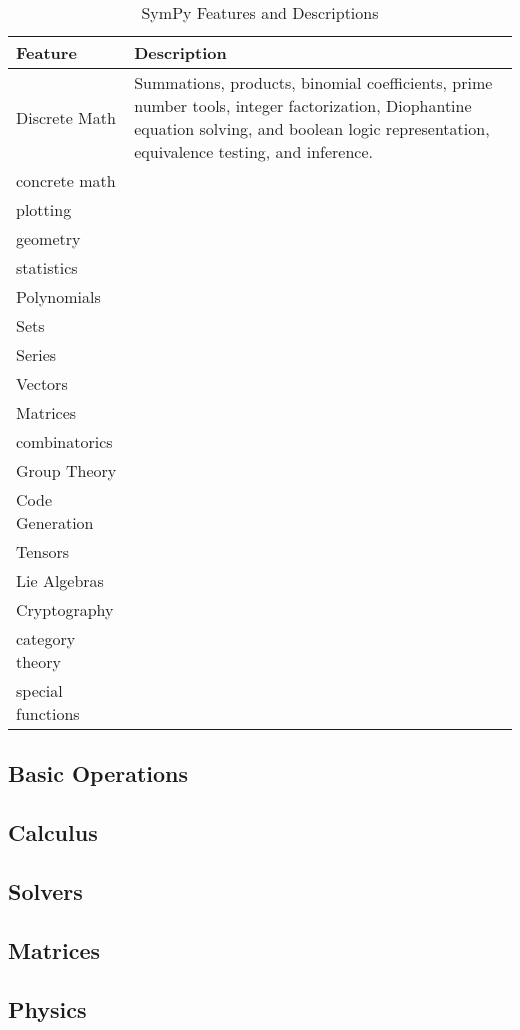 
\begin{table}
\label{features-table}
\caption{SymPy Features and Descriptions}
\begin{tabular}[htbc]{|l|l|}
\hline
\textbf{Feature} & \textbf{Description} \\
\hline
Discrete Math & Summations, products, binomial coefficients, prime number
    tools, integer factorization, Diophantine equation solving, and
    boolean logic representation, equivalence testing, and inference.\\
concrete math & \\
plotting & \\
geometry & \\
statistics & \\
Polynomials & \\
Sets & \\
Series & \\
Vectors & \\
Matrices & \\
combinatorics & \\
Group Theory & \\
Code Generation & \\
Tensors & \\
Lie Algebras & \\
Cryptography & \\
category theory & \\
special functions & \\
\hline
\end{tabular}
\end{table}


\subsection{Basic Operations}

\subsection{Calculus}

\subsection{Solvers}

\subsection{Matrices}

\subsection{Physics}

